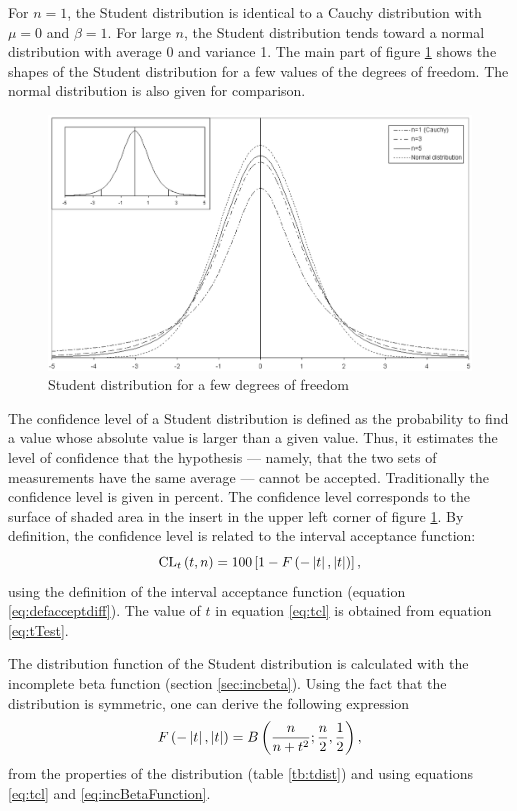 For $n=1$, the Student distribution is identical to a Cauchy
distribution with $\mu=0$ and $\beta=1$. For large $n$, the
Student distribution tends toward a normal distribution with
average 0 and variance 1. The main part of figure
\ref{fig:studentDistr} shows the shapes of the Student
distribution for a few values of the degrees of freedom. The
normal distribution is also given for comparison.
\begin{figure}
\centering\includegraphics[width=12cm]{Figures/StudentDistribution}
\caption{Student distribution for a few degrees of freedom
}\label{fig:studentDistr}
\end{figure}


The confidence level of a Student distribution is defined as the
probability to find a value whose absolute value is larger than a
given value. Thus, it estimates the level of confidence that the
hypothesis --- namely, that the two sets of measurements have the
same average --- cannot be accepted. Traditionally the confidence
level is given in percent. The confidence level corresponds to the
surface of shaded area in the insert in the upper left corner of
figure \ref{fig:studentDistr}. By definition, the confidence level
is related to the interval acceptance function:
\begin{equation}
\label{eq:tcl}
  {\mathop{\textrm{CL}}}_t\left(t,n\right)=100\left[1-
  F\left(-\left|t\right|,\left|t\right|\right)\right],
\end{equation}
using the definition of the interval acceptance function (equation
\ref{eq:defacceptdiff}). The value of $t$ in equation \ref{eq:tcl}
is obtained from equation \ref{eq:tTest}.

The distribution function of the Student distribution is
calculated with the incomplete beta function (\cf section
\ref{sec:incbeta}). Using the fact that the distribution is
symmetric, one can derive the following expression
\begin{equation}
\label{eq:tsymacc}
  F\left(-\left|t\right|,\left|t\right|\right)=B\left({n\over n + t^2};{n\over 2},{1\over
  2}\right),
\end{equation}
from the properties of the distribution (\cf table \ref{tb:tdist})
and using equations \ref{eq:tcl} and \ref{eq:incBetaFunction}.

